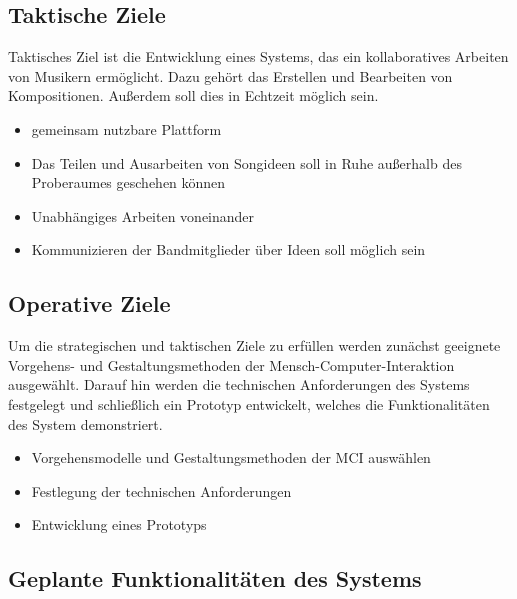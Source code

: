 \documentclass[12pt]{scrartcl}
\begin{document}
\subsection{Taktische Ziele}

Taktisches Ziel ist die Entwicklung eines Systems, das ein kollaboratives Arbeiten von Musikern ermöglicht. Dazu gehört das Erstellen und Bearbeiten von Kompositionen. Außerdem soll dies in Echtzeit möglich sein.
\begin{itemize}
\item gemeinsam nutzbare Plattform
\item Das Teilen und Ausarbeiten von Songideen soll in Ruhe außerhalb des Proberaumes geschehen können
\item Unabhängiges Arbeiten voneinander
\item Kommunizieren der Bandmitglieder über Ideen soll möglich sein
\
\end{itemize}

\subsection{Operative Ziele}

Um die strategischen und taktischen Ziele zu erfüllen werden zunächst geeignete Vorgehens- und Gestaltungsmethoden der Mensch-Computer-Interaktion ausgewählt. Darauf hin werden die technischen Anforderungen des Systems festgelegt und schließlich ein Prototyp entwickelt, welches die Funktionalitäten des System demonstriert.

\begin{itemize}
\item Vorgehensmodelle und Gestaltungsmethoden der MCI auswählen
\item Festlegung der technischen Anforderungen
\item Entwicklung eines Prototyps 
\end{itemize}


\subsection[Geplante Funktionalitäten]{Geplante Funktionalitäten des Systems}
\end{document}
